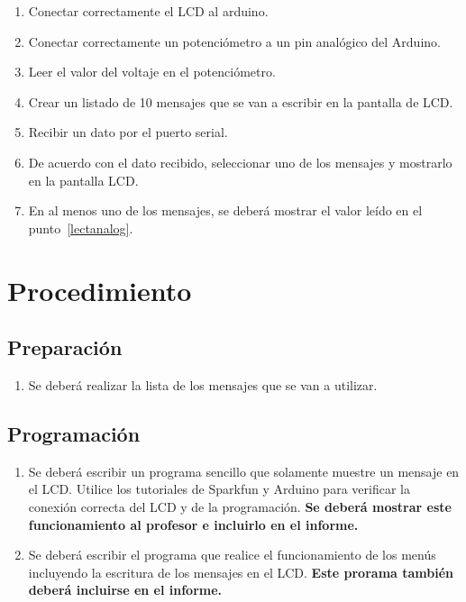 \documentclass[12pt,letterpaper]{IEEEtran}
\begin{document}
\begin{enumerate}
	\item Conectar correctamente el LCD al arduino.
	\item Conectar correctamente un potenciómetro a un pin analógico del Arduino.
	\item Leer el valor del voltaje en el potenciómetro.\label{lectanalog}
	\item Crear un listado de 10 mensajes que se van a escribir en la pantalla de LCD.
	\item Recibir un dato por el puerto serial.
	\item De acuerdo con el dato recibido, seleccionar uno de los mensajes y mostrarlo en la pantalla LCD.
	\item En al menos uno de los mensajes, se deberá mostrar el valor leído en el punto~\ref{lectanalog}.
\end{enumerate}

\section{Procedimiento}


\subsection{Preparación}

\begin{enumerate}
	\item Se deberá realizar la lista de los mensajes que se van a utilizar.
\end{enumerate}


\subsection{Programación}

\begin{enumerate}[resume]
    \item Se deberá escribir un programa sencillo que solamente muestre un mensaje en el LCD. Utilice los tutoriales de Sparkfun y Arduino para verificar la conexión correcta del LCD y de la programación. \textbf{Se deberá mostrar este funcionamiento al profesor e incluirlo en el informe.}
    \item Se deberá escribir el programa que realice el funcionamiento de los menús incluyendo la escritura de los mensajes en el LCD. \textbf{Este prorama también deberá incluirse en el informe.}
\end{enumerate}
\end{document}
